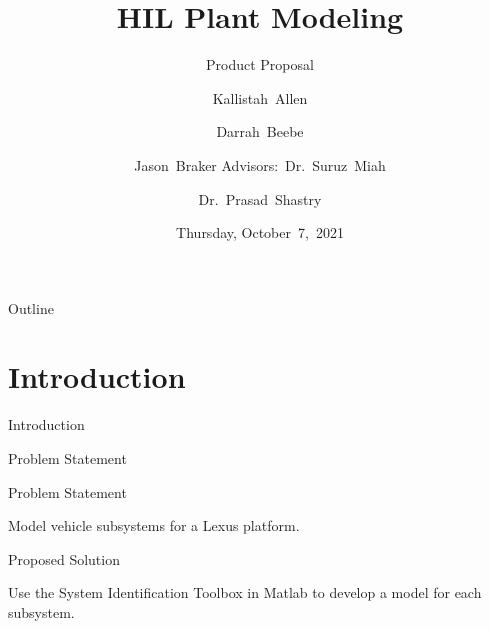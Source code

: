 \documentclass{beamer}
\title[HIL Plant Modeling (Proposal)]{HIL Plant Modeling}
\subtitle{Product Proposal}
\author[K.~Allen, D.~Beebe, J.~Braker]{Kallistah~Allen \and Darrah~Beebe \and
Jason~Braker
Advisors:~Dr.~Suruz~Miah \and Dr.~Prasad~Shastry}
\institute[Bradley University] %
{
  Department of Electrical and Computer Engineering\\
  Bradley University\\
  1501 W. Bradley Avenue\\
  Peoria, IL, 61625, USA
}
\date[October~7,~2021]{Thursday, October~7,~2021}
\begin{document}
\begin{frame}
  \titlepage
\end{frame}

\begin{frame}{Outline} 
  \tableofcontents%
\end{frame}

\section{Introduction}

\begin{frame}{Introduction}
\end{frame}

\begin{frame}{Problem Statement}
  \begin{block}{Problem Statement}
    \begin{LARGE}
      Model vehicle subsystems for a Lexus platform. 
    \end{LARGE}
  \end{block}
  \pause
  \begin{block}{Proposed Solution}
    \begin{LARGE}
      Use the System Identification Toolbox in Matlab to develop a model for each subsystem. 
    \end{LARGE}
  \end{block}
\end{frame}
\end{document}
